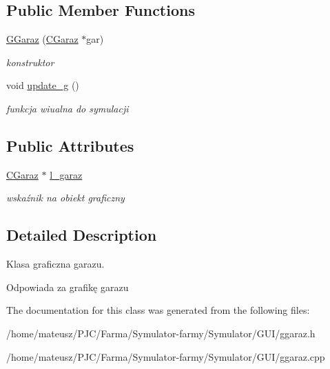 \subsection*{Public Member Functions}
\begin{DoxyCompactItemize}
\item 
\mbox{\label{class_g_garaz_a6fef3310b3e6f7108d39dff30705804d}} 
\mbox{\hyperlink{class_g_garaz_a6fef3310b3e6f7108d39dff30705804d}{G\+Garaz}} (\mbox{\hyperlink{class_c_garaz}{C\+Garaz}} $\ast$gar)
\begin{DoxyCompactList}\small\item\em konstruktor \end{DoxyCompactList}\item 
\mbox{\label{class_g_garaz_a290c6f6dfd8d222c17e4dd60c18db0e4}} 
void \mbox{\hyperlink{class_g_garaz_a290c6f6dfd8d222c17e4dd60c18db0e4}{update\+\_\+g}} ()
\begin{DoxyCompactList}\small\item\em funkcja wiualna do symulacji \end{DoxyCompactList}\end{DoxyCompactItemize}
\subsection*{Public Attributes}
\begin{DoxyCompactItemize}
\item 
\mbox{\label{class_g_garaz_acc6a1c21edba9622886cee51f4206093}} 
\mbox{\hyperlink{class_c_garaz}{C\+Garaz}} $\ast$ \mbox{\hyperlink{class_g_garaz_acc6a1c21edba9622886cee51f4206093}{l\+\_\+garaz}}
\begin{DoxyCompactList}\small\item\em wskaźnik na obiekt graficzny \end{DoxyCompactList}\end{DoxyCompactItemize}


\subsection{Detailed Description}
Klasa graficzna garazu. 

Odpowiada za grafikę garazu 

The documentation for this class was generated from the following files\+:\begin{DoxyCompactItemize}
\item 
/home/mateusz/\+P\+J\+C/\+Farma/\+Symulator-\/farmy/\+Symulator/\+G\+U\+I/ggaraz.\+h\item 
/home/mateusz/\+P\+J\+C/\+Farma/\+Symulator-\/farmy/\+Symulator/\+G\+U\+I/ggaraz.\+cpp\end{DoxyCompactItemize}
